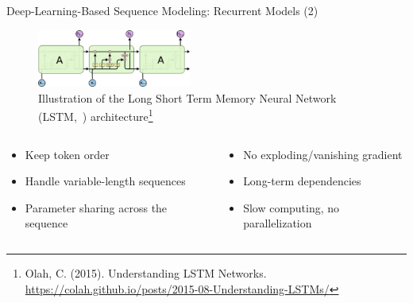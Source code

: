 \documentclass[11pt,aspectratio=169]{beamer}
\begin{document}
\begin{frame}{Deep-Learning-Based Sequence Modeling: Recurrent Models (2)}
    \begin{figure}
        \centering
        \includegraphics[width=0.45\textwidth]{LSTM3-chain.png}
        \caption{\centering Illustration of the Long Short Term Memory Neural Network (LSTM,~\cite{lstm}) architecture\footnote{\tiny Olah, C. (2015). Understanding LSTM Networks. \url{https://colah.github.io/posts/2015-08-Understanding-LSTMs/}}}
    \end{figure}
    \begin{columns}
        \begin{column}{0.5\linewidth}
            \begin{itemize}
                \item {\color{darkgreen}\checkmark} Keep token order
                \item {\color{darkgreen}\checkmark} Handle variable-length sequences
                \item {\color{darkgreen}\checkmark} Parameter sharing across the sequence
            \end{itemize}
        \end{column}
        \begin{column}{0.5\linewidth}
            \begin{itemize}
                \item {\color{darkgreen}\checkmark} No exploding/vanishing gradient
                \item {\color{darkgreen}\checkmark} Long-term dependencies
                \item {\color{red}} Slow computing, no parallelization
            \end{itemize}
        \end{column}
    \end{columns}
\end{frame}
\end{document}
